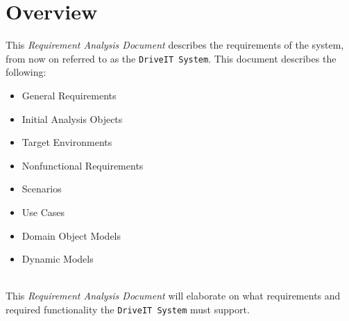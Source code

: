 \section{Overview}
This \textit{Requirement Analysis Document} describes the requirements of the system, from now on referred to as the \texttt{DriveIT System}.
This document describes the following:
\begin{itemize}
	\item General Requirements
	\item Initial Analysis Objects
	\item Target Environments
	\item Nonfunctional Requirements
	\item Scenarios
	\item Use Cases 
	\item Domain Object Models
	\item Dynamic Models 
\end{itemize}
\\
This \textit{Requirement Analysis Document} will elaborate on what requirements and required functionality the \texttt{DriveIT System} must support.